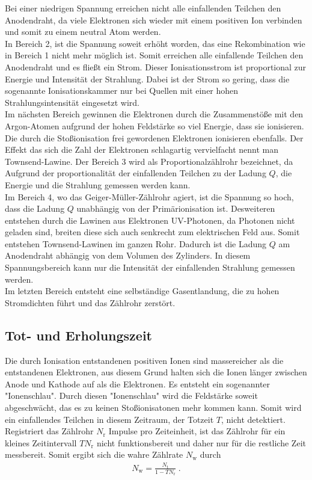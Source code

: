 Bei einer niedrigen Spannung erreichen nicht alle einfallenden Teilchen den Anodendraht, da viele Elektronen sich wieder mit einem positiven Ion verbinden und somit zu einem neutral Atom werden.\\
In Bereich 2, ist die Spannung soweit erhöht worden, das eine Rekombination wie in Bereich 1 nicht mehr möglich ist. Somit erreichen alle einfallende Teilchen den Anodendraht und es fließt ein Strom. Dieser Ionisationsstrom ist proportional zur Energie und Intensität der Strahlung. Dabei ist der Strom so gering, dass die sogenannte Ionisationskammer nur bei Quellen mit einer hohen Strahlungsintensität eingesetzt wird.\\
Im nächsten Bereich gewinnen die Elektronen durch die Zusammenstöße mit den Argon-Atomen aufgrund der hohen Feldstärke so viel Energie, dass sie ionisieren. Die durch die Stoßionisation  frei gewordenen Elektronen ionisieren ebenfalls. Der Effekt das sich die Zahl der Elektronen schlagartig vervielfacht nennt man Townsend-Lawine. Der Bereich 3 wird als Proportionalzählrohr bezeichnet, da Aufgrund der proportionalität der einfallenden Teilchen zu der Ladung $Q$, die Energie und die Strahlung gemessen werden kann. \\
Im Bereich 4, wo das Geiger-Müller-Zählrohr agiert, ist die Spannung so hoch, dass die Ladung $Q$ unabhängig von der Primärionisation ist. Desweiteren entstehen durch die Lawinen aus Elektronen UV-Photonen, da Photonen nicht geladen sind, breiten diese sich auch senkrecht zum elektrischen Feld aus. Somit entstehen Townsend-Lawinen im ganzen Rohr. Dadurch ist die Ladung $Q$ am Anodendraht abhängig von dem Volumen des Zylinders. In diesem Spannungsbereich kann nur die Intensität der einfallenden Strahlung gemessen werden.\\
Im letzten Bereich entsteht eine selbständige Gasentlandung, die zu hohen Stromdichten führt und das Zählrohr zerstört.

\subsection{Tot- und Erholungszeit}
Die durch Ionisation entstandenen positiven Ionen sind massereicher als die entstandenen Elektronen, aus diesem Grund halten sich die Ionen länger zwischen Anode und Kathode auf als die Elektronen. Es entsteht ein sogenannter "Ionenschlau". Durch diesen "Ionenschlau" wird die Feldstärke soweit abgeschwächt, das es zu keinen Stoßionisatonen mehr kommen kann. Somit wird ein einfallendes Teilchen in diesem Zeitraum, der Totzeit $T$, nicht detektiert. Registriert das Zählrohr $N_\textrm{r}$ Impulse pro Zeiteinheit, ist das Zählrohr für ein kleines Zeitintervall $TN_\textrm{r}$ nicht funktionsbereit und daher nur für  die restliche Zeit messbereit. Somit ergibt sich die wahre Zählrate $N_\textrm{w}$ durch
\begin{align}
  N_\textrm{w}= \frac{N_\textrm{t}}{1-TN_\textrm{r}}\;.
  \label{eq:N}
\end{align}

